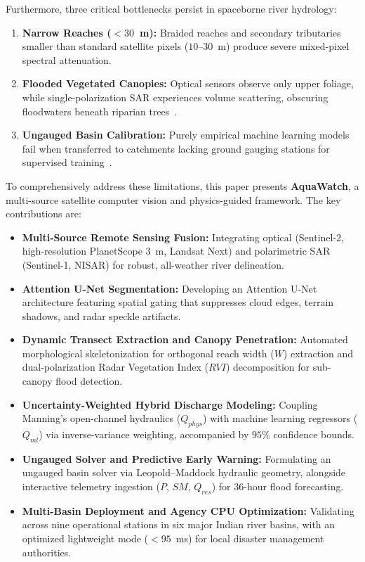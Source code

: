 \documentclass[conference]{IEEEtran}
\begin{document}
Furthermore, three critical bottlenecks persist in spaceborne river hydrology:
\begin{enumerate}
    \item \textbf{Narrow Reaches ($<30$~m):} Braided reaches and secondary tributaries smaller than standard satellite pixels ($10$--$30$~m) produce severe mixed-pixel spectral attenuation.
    \item \textbf{Flooded Vegetated Canopies:} Optical sensors observe only upper foliage, while single-polarization SAR experiences volume scattering, obscuring floodwaters beneath riparian trees~\cite{townsend2011}.
    \item \textbf{Ungauged Basin Calibration:} Purely empirical machine learning models fail when transferred to catchments lacking ground gauging stations for supervised training~\cite{sivapalan2003}.
\end{enumerate}

To comprehensively address these limitations, this paper presents \textbf{AquaWatch}, a multi-source satellite computer vision and physics-guided framework. The key contributions are:
\begin{itemize}
    \item \textbf{Multi-Source Remote Sensing Fusion:} Integrating optical (Sentinel-2, high-resolution PlanetScope 3~m, Landsat Next) and polarimetric SAR (Sentinel-1, NISAR) for robust, all-weather river delineation.
    \item \textbf{Attention U-Net Segmentation:} Developing an Attention U-Net architecture featuring spatial gating that suppresses cloud edges, terrain shadows, and radar speckle artifacts.
    \item \textbf{Dynamic Transect Extraction and Canopy Penetration:} Automated morphological skeletonization for orthogonal reach width ($W$) extraction and dual-polarization Radar Vegetation Index ($RVI$) decomposition for sub-canopy flood detection.
    \item \textbf{Uncertainty-Weighted Hybrid Discharge Modeling:} Coupling Manning's open-channel hydraulics ($Q_{phys}$) with machine learning regressors ($Q_{ml}$) via inverse-variance weighting, accompanied by $95\%$ confidence bounds.
    \item \textbf{Ungauged Solver and Predictive Early Warning:} Formulating an ungauged basin solver via Leopold--Maddock hydraulic geometry, alongside interactive telemetry ingestion ($P$, $SM$, $Q_{res}$) for 36-hour flood forecasting.
    \item \textbf{Multi-Basin Deployment and Agency CPU Optimization:} Validating across nine operational stations in six major Indian river basins, with an optimized lightweight mode ($<95$~ms) for local disaster management authorities.
\end{itemize}
\end{document}
